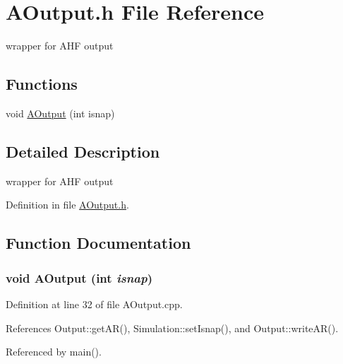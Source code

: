 \section{AOutput.h File Reference}
\label{AOutput_8h}


wrapper for AHF output  


\subsection*{Functions}
\begin{DoxyCompactItemize}
\item 
void \hyperlink{AOutput_8h_ad22eec91656af58e2e2b3be8f346233a}{AOutput} (int isnap)
\end{DoxyCompactItemize}


\subsection{Detailed Description}
wrapper for AHF output 

Definition in file \hyperlink{AOutput_8h_source}{AOutput.h}.



\subsection{Function Documentation}
\subsubsection[{AOutput}]{\setlength{\rightskip}{0pt plus 5cm}void AOutput (int {\em isnap})}\label{AOutput_8h_ad22eec91656af58e2e2b3be8f346233a}


Definition at line 32 of file AOutput.cpp.



References Output::getAR(), Simulation::setIsnap(), and Output::writeAR().



Referenced by main().


